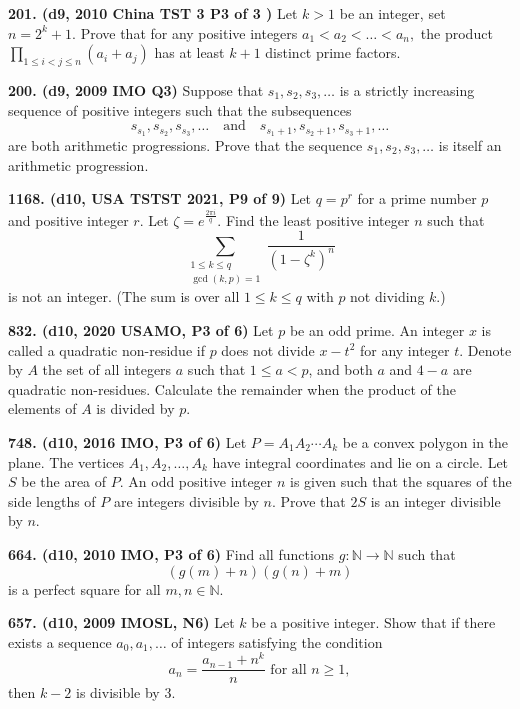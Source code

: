 \documentclass{article}
\begin{document}
\textbf{201. (\color{red}d9\color{black}, 2010 China TST 3 P3 of 3  )} Let $k > 1$ be an integer, set $n = 2^k + 1.$ Prove that for any positive integers $a_{1} < a_{2} < \dots < a_{n},$ the product $\displaystyle\prod_{1 \leq i < j \leq n}^{} (a_{i} + a_{j})$ has at least $k + 1$ distinct prime factors.

\textbf{200. (\color{red}d9\color{black}, 2009 IMO Q3)} Suppose that $s_1, s_2, s_3, \dots$ is a strictly increasing sequence of positive integers such that the subsequences $$s_{s_1}, s_{s_2}, s_{s_3}, \dots \quad \text{and} \quad s_{s_1 + 1}, s_{s_2 + 1}, s_{s_3 + 1}, \dots$$ are both arithmetic progressions. Prove that the sequence $s_1, s_2, s_3, \dots$ is itself an arithmetic progression.

\textbf{1168. (\color{red}d10\color{black}, USA TSTST 2021, P9 of 9)} Let $q=p^r$ for a prime number $p$ and positive integer $r$. Let $\zeta = e^{\frac{2\pi i}{q}}$. Find the least positive integer $n$ such that
\[\sum_{\substack{1\leq k\leq q\\ \gcd(k,p)=1}} \frac{1}{(1-\zeta^k)^n}\]is not an integer. (The sum is over all $1\leq k\leq q$ with $p$ not dividing $k$.)

\textbf{832. (\color{red}d10\color{black}, 2020 USAMO, P3 of 6)} Let $p$ be an odd prime. An integer $x$ is called a quadratic non-residue if $p$ does not divide $x-t^2$ for any integer $t$.
\smallbreak
Denote by $A$ the set of all integers $a$ such that $1\le a<p$, and both $a$ and $4-a$ are quadratic non-residues. Calculate the remainder when the product of the elements of $A$ is divided by $p$.

\textbf{748. (\color{red}d10\color{black}, 2016 IMO, P3 of 6)} Let $P=A_1A_2\cdots A_k$ be a convex polygon in the plane. The vertices $A_1, A_2, \ldots, A_k$ have integral coordinates and lie on a circle. Let $S$ be the area of $P$. An odd positive integer $n$ is given such that the squares of the side lengths of $P$ are integers divisible by $n$. Prove that $2S$ is an integer divisible by $n$.

\textbf{664. (\color{red}d10\color{black}, 2010 IMO, P3 of 6)} Find all functions $g:\mathbb{N}\rightarrow\mathbb{N}$ such that\[\left(g(m)+n\right)\left(g(n)+m\right)\]is a perfect square for all $m,n\in\mathbb{N}.$

\textbf{657. (\color{red}d10\color{black}, 2009 IMOSL, N6)} Let $k$ be a positive integer. Show that if there exists a sequence $a_0,a_1,\ldots$ of integers satisfying the condition\[a_n=\frac{a_{n-1}+n^k}{n}\text{ for all } n\geq 1,\]then $k-2$ is divisible by $3$.
\end{document}
